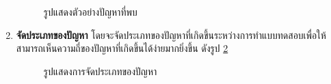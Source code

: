 \begin{enumerate}
\begin{figure}[H]
              \caption{รูปแสดงตัวอย่างปัญหาที่พบ}\label{fig:exam-GateringIssue}
          \end{figure}
    \item \textbf{จัดประเภทของปัญหา} โดยจะจัดประเภทของปัญหาที่เกิดขึ้นระหว่างการทำแบบทดสอบเพื่อให้สามารถเห็นความถี่ของปัญหาที่เกิดขึ้นได้ง่ายมากยิ่งขึ้น ดังรูป \ref{fig:Groping}
          \begin{figure}[H]\centering
              \caption{รูปแสดงการจัดประเภทของปัญหา}\label{fig:Groping}
          \end{figure}
          \begin{figure}[H]\centering

\end{figure}
\end{enumerate}
